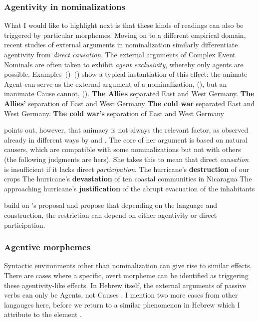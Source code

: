 {		\subsubsection{Agentivity in nominalizations}
What I would like to highlight next is that these kinds of readings can also be triggered by particular morphemes. Moving on to a different empirical domain, recent studies of external arguments in nominalization \citep{sichel10n,alexiadouetal13,ahdout18nom} similarly differentiate agentivity from \emph{direct causation}. The external arguments of Complex Event Nominals are often taken to exhibit \emph{agent exclusivity}, whereby only agents are possible. Examples~(\nextx)--(\anextx) show a typical instantiation of this effect: the animate Agent can serve as the external argument of a nominalization, (\nextx), but an inanimate Cause cannot, (\anextx).
\pex
	\a \textbf{The Allies} separated East and West Germany.
	\a \textbf{The Allies'} separation of East and West Germany
\xe
\pex
	\a \textbf{The cold war} separated East and West Germany.
	\a \ljudge{\#}\textbf{The cold war's} separation of East and West Germany
\xe

\cite{sichel10n} points out, however, that animacy is not always the relevant factor, as observed already in different ways by \cite{pesetsky95} and \cite{marantz97}. The core of her argument is based on natural causers, which are compatible with some nominalizations but not with others (the following judgments are hers). She takes this to mean that direct \emph{causation} is insufficient if it lacks direct \emph{participation}.
\pex
	\a The hurricane's \textbf{destruction} of our crops
	\a The hurricane's \textbf{devastation} of ten coastal communities in Nicaragua
\xe
\ex \ljudge{\#} The approaching hurricane's \textbf{justification} of the abrupt evacuation of the inhabitants
\xe

\cite{alexiadouetal13,alexiadouetal13jcgl} build on \citeauthor{sichel10n}'s proposal and propose that depending on the language and construction, the restriction can depend on either agentivity or direct participation.

		\subsubsection{Agentive morphemes}
Syntactic environments other than nominalization can give rise to similar effects. There are cases where a specific, overt morpheme can be identified as triggering these agentivity-like effects. In Hebrew itself, the external arguments of passive verbs can only be Agents, not Causes \citep{doron03}. I mention two more cases from other langauges here, before we return to a similar phenomenon in Hebrew which I attribute to the element {\va}.

}
